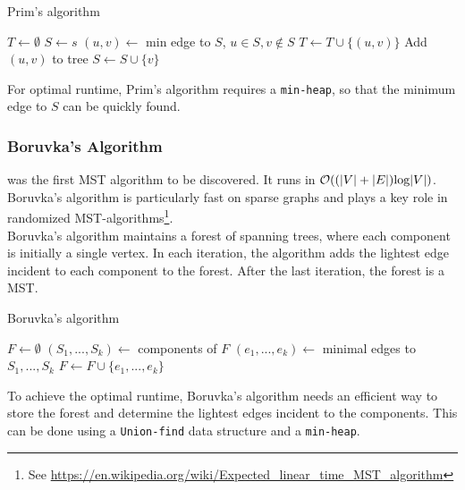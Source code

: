 \documentclass[a3paper, landscape, 11pt]{article} %
\begin{document}
\begin{multicols*}{4}
 
 \begin{algorithm}[H]
\caption{Prim's algorithm}
\begin{algorithmic}[1]
\State $T \gets \emptyset$ 
\State $S \gets {s}$ 
	\State $(u,v) \gets$ min edge to $S$, $u\in S, v \not \in S$
	\State $T \gets T \cup \{(u,v)\} $ \Comment Add $(u,v)$ to tree
	\State $S\gets S \cup \{v\}$
\EndWhile
\EndProcedure
\end{algorithmic}
\end{algorithm}
For optimal runtime, Prim's algorithm requires a \texttt{min-heap}, so that the minimum edge to $S$ can be quickly found.


\subsubsection*{Boruvka's Algorithm}

 was the first MST algorithm to be discovered. It runs in $\mathcal{O}((|V|+|E|) \text{log}|V|)$. Boruvka's algorithm is particularly fast on sparse graphs and plays a key role in randomized MST-algorithms\footnote{See \url{https://en.wikipedia.org/wiki/Expected_linear_time_MST_algorithm}}.\\

 Boruvka's algorithm maintains a forest of spanning trees, where each component is initially a single vertex. In each iteration, the algorithm adds the lightest edge incident to each component to the forest. After the last iteration, the forest is a MST.

\begin{algorithm}[H]
\caption{Boruvka's algorithm}
\begin{algorithmic}[1]
\State $F \gets \emptyset$  
	\State $(S_1,...,S_k) \gets$ components of $F$
	\State $(e_1,...,e_k) \gets$ minimal edges to $S_1,...,S_k$
	\State $F \gets F \cup \{e_1,...,e_k\}$
\EndWhile
\EndProcedure
\end{algorithmic}
\end{algorithm}

To achieve the optimal runtime, Boruvka's algorithm needs an efficient way to store the forest and determine the lightest edges incident to the components. This can be done using a \texttt{Union-find} data structure and a \texttt{min-heap}.

\vfill %


\end{multicols*}
\end{document}
